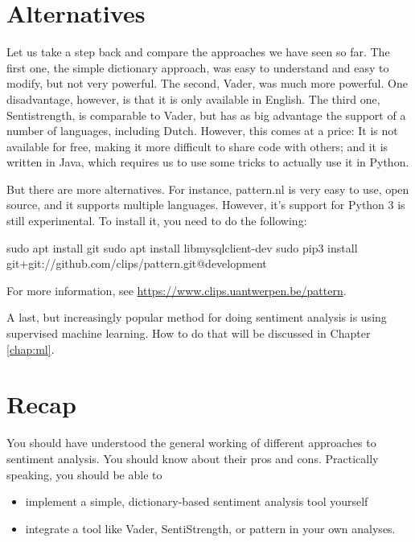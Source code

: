 \documentclass[a4paper,12pt]{book}
\begin{document}
\section{Alternatives}
Let us take a step back and compare the approaches we have seen so far. The first one, the simple dictionary approach, was easy to understand and easy to modify, but not very powerful. The second, Vader, was much more powerful. One disadvantage, however, is that it is only available in English. The third one, Sentistrength, is comparable to Vader, but has as big advantage the support of a number of languages, including Dutch. However, this comes at a price: It is not available for free, making it more difficult to share code with others; and it is written in Java, which requires us to use some tricks to actually use it in Python.

But there are more alternatives. For instance, pattern.nl \citep{DeSmedt2012} is very easy to use, open source, and it supports multiple languages. However, it's support for Python 3 is still experimental. 
To install it, you need to do the following:
\begin{lstlistingbash}
sudo apt install git
sudo apt install libmysqlclient-dev
sudo pip3 install git+git://github.com/clips/pattern.git@development
\end{lstlistingbash}

For more information, see \url{https://www.clips.uantwerpen.be/pattern}.

A last, but increasingly popular method for doing sentiment analysis is using supervised machine learning. How to do that will be discussed in Chapter \ref{chap:ml}.


\section{Recap}
You should have understood the general working of different approaches to sentiment analysis. You should know about their pros and cons. Practically speaking, you should be able to
\begin{itemize}
	\item implement a simple, dictionary-based sentiment analysis tool yourself
	\item integrate a tool like Vader, SentiStrength, or pattern in your own analyses.
\end{itemize}
\end{document}
